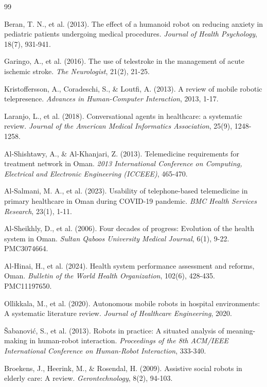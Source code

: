 \begin{thebibliography}{99}

Beran, T. N., et al. (2013). The effect of a humanoid robot on reducing anxiety in pediatric patients undergoing medical procedures. \textit{Journal of Health Psychology}, 18(7), 931-941.


Garingo, A., et al. (2016). The use of telestroke in the management of acute ischemic stroke. \textit{The Neurologist}, 21(2), 21-25.

Kristoffersson, A., Coradeschi, S., \& Loutfi, A. (2013). A review of mobile robotic telepresence. \textit{Advances in Human-Computer Interaction}, 2013, 1-17.

Laranjo, L., et al. (2018). Conversational agents in healthcare: a systematic review. \textit{Journal of the American Medical Informatics Association}, 25(9), 1248-1258.

Al-Shishtawy, A., \& Al-Khanjari, Z. (2013). Telemedicine requirements for treatment network in Oman. \textit{2013 International Conference on Computing, Electrical and Electronic Engineering (ICCEEE)}, 465-470.

Al-Salmani, M. A., et al. (2023). Usability of telephone-based telemedicine in primary healthcare in Oman during COVID-19 pandemic. \textit{BMC Health Services Research}, 23(1), 1-11.

Al-Sheikhly, D., et al. (2006). Four decades of progress: Evolution of the health system in Oman. \textit{Sultan Qaboos University Medical Journal}, 6(1), 9-22. PMC3074664.

Al-Hinai, H., et al. (2024). Health system performance assessment and reforms, Oman. \textit{Bulletin of the World Health Organization}, 102(6), 428-435. PMC11197650.

Ollikkala, M., et al. (2020). Autonomous mobile robots in hospital environments: A systematic literature review. \textit{Journal of Healthcare Engineering}, 2020.

Šabanović, S., et al. (2013). Robots in practice: A situated analysis of meaning-making in human-robot interaction. \textit{Proceedings of the 8th ACM/IEEE International Conference on Human-Robot Interaction}, 333-340.

Broekens, J., Heerink, M., \& Rosendal, H. (2009). Assistive social robots in elderly care: A review. \textit{Gerontechnology}, 8(2), 94-103.


\end{thebibliography}
